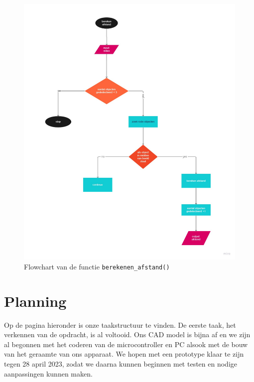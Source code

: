 \documentclass[kulak]{kulakarticle} %
\begin{document}
				\begin{figure} [!h]
					\centering
					\includegraphics[width = 0.8 \textwidth]{flowchart afstand berekenen.pdf}
				\cprotect\caption{Flowchart van de functie \verb*|berekenen_afstand()|}
				\end{figure}
 


\section{Planning}
	Op de pagina hieronder is onze taakstructuur te vinden. De eerste taak, het verkennen van de opdracht, is al voltooid. Ons CAD model is bijna af en we zijn al begonnen met het coderen van de microcontroller en PC alsook met de bouw van het geraamte van ons apparaat. We hopen met een prototype klaar te zijn tegen 28 april 2023, zodat we daarna kunnen beginnen met testen en nodige aanpassingen kunnen maken.
	
\end{document}
